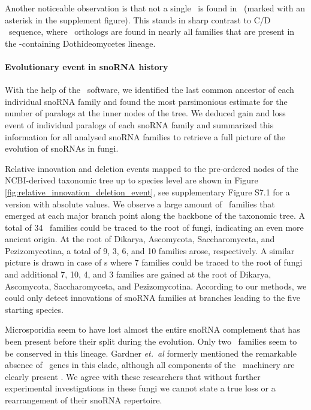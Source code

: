 Another noticeable observation is that not a single \haca\ is found in
\Ptt\ (marked with an asterisk in the supplement figure). This stands
in sharp contrast to C/D \sno\ sequence, where \ptt\ orthologs are
found in nearly all families that are present in the \ptt-containing
Dothideomycetes lineage.


\paragraph{\textbf{Evolutionary event in snoRNA history}}

With the help of the \epope\ software, we identified the last common
ancestor of each individual snoRNA family and found the most
parsimonious estimate for the number of paralogs at the inner nodes of
the tree.  We deduced gain and loss event of individual paralogs of
each snoRNA family and summarized this information for all analysed
snoRNA families to retrieve a full picture of the evolution of snoRNAs
in fungi.

Relative innovation and deletion events mapped to the pre-ordered
nodes of the NCBI-derived taxonomic tree up to species level are shown
in Figure \ref{fig:relative_innovation_deletion_event}, see
supplementary Figure S7.1 for a version with absolute values.  We
observe a large amount of \sno\ families that emerged at each major
branch point along the backbone of the taxonomic tree. A total of 34
\cd\ families could be traced to the root of fungi, indicating an even
more ancient origin. At the root of Dikarya, Ascomycota,
Saccharomyceta, and Pezizomycotina, a total of 9, 3, 6, and 10
families arose, respectively. A similar picture is drawn in case of
\haca s where 7 families could be traced to the root of fungi and
additional 7, 10, 4, and 3 families are gained at the root of Dikarya,
Ascomycota, Saccharomyceta, and Pezizomycotina.  According to our
methods, we could only detect innovations of snoRNA families at
branches leading to the five starting species.

Microsporidia seem to have lost almost the entire snoRNA complement
that has been present before their split during the evolution.  Only
two \cd\ families seem to be conserved in this lineage.  Gardner
\emph{et.~al} formerly mentioned the remarkable absence of \sno\ genes
in this clade, although all components of the \sno\ machinery are
clearly present \cite{Gardner:2010}.  We agree with these researchers
that without further experimental investigations in these fungi we
cannot state a true loss or a rearrangement of their snoRNA
repertoire.

